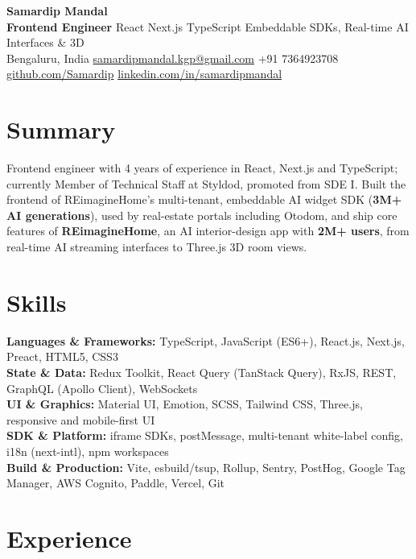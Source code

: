 \documentclass[10pt,letterpaper]{article}
\newcommand{\sep}{\enspace\textbar\enspace}
\begin{document}
\begin{center}
  {\LARGE\textbf{Samardip Mandal}}\\[3pt]
  \textbf{Frontend Engineer} \sep React \textperiodcentered{} Next.js \textperiodcentered{} TypeScript \sep
  Embeddable SDKs, Real-time AI Interfaces \& 3D\\[3pt]
  {\small Bengaluru, India \sep
  \href{mailto:samardipmandal.kgp@gmail.com}{samardipmandal.kgp@gmail.com} \sep
  +91 7364923708 \sep
  \href{https://github.com/Samardip}{github.com/Samardip} \sep
  \href{https://linkedin.com/in/samardipmandal}{linkedin.com/in/samardipmandal}}
\end{center}

\section{Summary}
Frontend engineer with 4 years of experience in React, Next.js and TypeScript; currently Member of Technical Staff
at Styldod, promoted from SDE I. Built the frontend of REimagineHome's multi-tenant, embeddable AI widget SDK
(\textbf{3M+ AI generations}), used by real-estate portals including Otodom, and ship core features of
\textbf{REimagineHome}, an AI interior-design app with \textbf{2M+ users}, from real-time AI streaming interfaces to
Three.js 3D room views.

\section{Skills}
\textbf{Languages \& Frameworks:} TypeScript, JavaScript (ES6+), React.js, Next.js, Preact, HTML5, CSS3\\
\textbf{State \& Data:} Redux Toolkit, React Query (TanStack Query), RxJS, REST, GraphQL (Apollo Client), WebSockets\\
\textbf{UI \& Graphics:} Material UI, Emotion, SCSS, Tailwind CSS, Three.js, responsive and mobile-first UI\\
\textbf{SDK \& Platform:} iframe SDKs, postMessage, multi-tenant white-label config, i18n (next-intl), npm workspaces\\
\textbf{Build \& Production:} Vite, esbuild/tsup, Rollup, Sentry, PostHog, Google Tag Manager, AWS Cognito, Paddle, Vercel, Git

\section{Experience}
\end{document}
